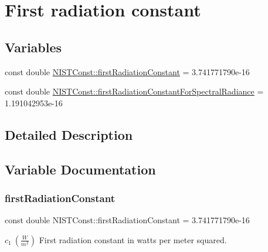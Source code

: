 \hypertarget{group___n_i_s_t_const-_first_radiation_constant}{}\section{First radiation constant}
\label{group___n_i_s_t_const-_first_radiation_constant}
\subsection*{Variables}
\begin{DoxyCompactItemize}
\item 
const double \hyperlink{group___n_i_s_t_const-_first_radiation_constant_ga59a54a84c539969a14695bd822b116cb}{N\+I\+S\+T\+Const\+::first\+Radiation\+Constant} = 3.\+741771790e-\/16
\item 
const double \hyperlink{group___n_i_s_t_const-_first_radiation_constant_ga877c0bc2579b88ae515b80aeb58aa68e}{N\+I\+S\+T\+Const\+::first\+Radiation\+Constant\+For\+Spectral\+Radiance} = 1.\+191042953e-\/16
\end{DoxyCompactItemize}


\subsection{Detailed Description}


\subsection{Variable Documentation}
\mbox{\label{group___n_i_s_t_const-_first_radiation_constant_ga59a54a84c539969a14695bd822b116cb}} 
\subsubsection{\texorpdfstring{first\+Radiation\+Constant}{firstRadiationConstant}}
{\footnotesize\ttfamily const double N\+I\+S\+T\+Const\+::first\+Radiation\+Constant = 3.\+741771790e-\/16}

$c_1 \ (\frac{W}{m^2})$ First radiation constant in watts per meter squared. \mbox{\label{group___n_i_s_t_const-_first_radiation_constant_ga877c0bc2579b88ae515b80aeb58aa68e}} 
